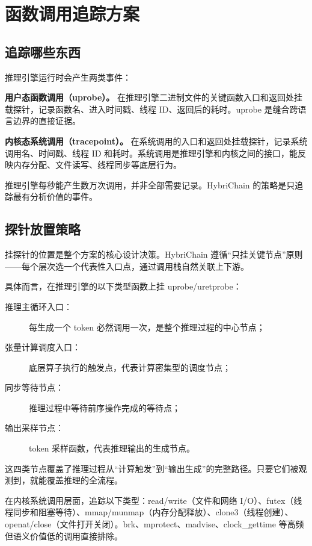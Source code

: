 \section{函数调用追踪方案}

\subsection{追踪哪些东西}

推理引擎运行时会产生两类事件：

\textbf{用户态函数调用（uprobe）。} 在推理引擎二进制文件的关键函数入口和返回处挂载探针，记录函数名、进入时间戳、线程 ID、返回后的耗时。uprobe 是缝合跨语言边界的直接证据。

\textbf{内核态系统调用（tracepoint）。} 在系统调用的入口和返回处挂载探针，记录系统调用名、时间戳、线程 ID 和耗时。系统调用是推理引擎和内核之间的接口，能反映内存分配、文件读写、线程同步等底层行为。

推理引擎每秒能产生数万次调用，并非全部需要记录。HybriChain 的策略是只追踪最有分析价值的事件。

\subsection{探针放置策略}

挂探针的位置是整个方案的核心设计决策。HybriChain 遵循“只挂关键节点”原则——每个层次选一个代表性入口点，通过调用栈自然关联上下游。

具体而言，在推理引擎的以下类型函数上挂 uprobe/uretprobe：

\begin{description}
    \item[推理主循环入口：] 每生成一个 token 必然调用一次，是整个推理过程的中心节点；
    \item[张量计算调度入口：] 底层算子执行的触发点，代表计算密集型的调度节点；
    \item[同步等待节点：] 推理过程中等待前序操作完成的等待点；
    \item[输出采样节点：] token 采样函数，代表推理输出的生成节点。
\end{description}

这四类节点覆盖了推理过程从“计算触发”到“输出生成”的完整路径。只要它们被观测到，就能覆盖推理的全流程。

在内核系统调用层面，追踪以下类型：read/write（文件和网络 I/O）、futex（线程同步和阻塞等待）、mmap/munmap（内存分配释放）、clone3（线程创建）、openat/close（文件打开关闭）。brk、mprotect、madvise、clock\_gettime 等高频但语义价值低的调用直接排除。

